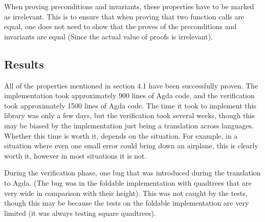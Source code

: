 When proving preconditions and invariants, these properties have to be marked as irrelevant. This is to ensure that when proving that two function calls are equal, one does not need to show that the proves of the preconditions and invariants are equal (Since the actual value of proofs is irrelevant).

\subsection{Results}
All of the properties mentioned in section 4.1 have been successfully proven. The implementation took approximately 900 lines of Agda code, and the verification took approximately 1500 lines of Agda code. The time it took to implement this library was only a few days, but the verification took several weeks, though this may be biased by the implementation just being a translation across languages. Whether this time is worth it, depends on the situation. For example, in a situation where even one small error could bring down an airplane, this is clearly worth it, however in most situations it is not.

During the verification phase, one bug that was introduced during the translation to Agda. (The bug was in the foldable implementation with quadtrees that are very wide in comparison with their height). This was not caught by the tests, though this may be because the tests on the foldable implementation are very limited (it was always testing square quadtrees).
